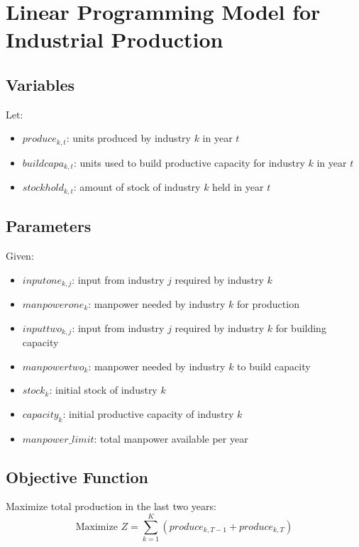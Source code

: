 \documentclass{article}
\begin{document}
\section*{Linear Programming Model for Industrial Production}

\subsection*{Variables}
Let:
\begin{itemize}
    \item \( produce_{k,t} \): units produced by industry \( k \) in year \( t \)
    \item \( buildcapa_{k,t} \): units used to build productive capacity for industry \( k \) in year \( t \)
    \item \( stockhold_{k,t} \): amount of stock of industry \( k \) held in year \( t \)
\end{itemize}

\subsection*{Parameters}
Given:
\begin{itemize}
    \item \( inputone_{k, j} \): input from industry \( j \) required by industry \( k \)
    \item \( manpowerone_{k} \): manpower needed by industry \( k \) for production
    \item \( inputtwo_{k, j} \): input from industry \( j \) required by industry \( k \) for building capacity
    \item \( manpowertwo_{k} \): manpower needed by industry \( k \) to build capacity
    \item \( stock_{k} \): initial stock of industry \( k \)
    \item \( capacity_{k} \): initial productive capacity of industry \( k \)
    \item \( manpower\_limit \): total manpower available per year
\end{itemize}

\subsection*{Objective Function}
Maximize total production in the last two years:
\[
\text{Maximize } Z = \sum_{k=1}^{K} (produce_{k, T-1} + produce_{k, T})
\]
\end{document}
